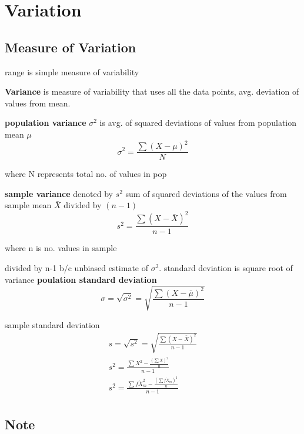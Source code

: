 \documentclass[11pt]{amsart}
\begin{document}
\section{Variation}
\subsection{Measure of Variation}
\par range is simple measure of variability
\par \textbf{Variance} is measure of variability that uses all the data points, avg. deviation of values from mean.
\par \textbf{population variance} $\sigma^2$ is avg. of squared deviations of values from population mean $\mu$
\begin{equation}
\sigma^2 = \frac{\sum{(X-\mu)^2}}{N}
\end{equation}
\par where N represents total no. of values in pop
\par \textbf{sample variance} denoted by $s^2$ sum of squared deviations of the values from sample mean $\bar{X}$ divided by $(n-1)$
\begin{equation}
s^2 = \frac {\sum{(X-\bar{X})^2}}{n-1}
\end{equation}
\par where n is no. values in sample
\par divided by n-1  b/c unbiased estimate of $\sigma^2$. standard deviation is square root of variance
\textbf{poulation standard deviation}
\begin{equation}
\sigma  = \sqrt{\sigma^2} = \sqrt {\frac{\sum{(X-\bar{\mu})^2}}{n-1}}
\end{equation}
\par sample standard deviation
\begin{equation}
\begin{split}
s  = \sqrt{s^2} = \sqrt {\frac{\sum{(X-\bar{X})^2}}{n-1}} \\
s^2 = \frac{\sum{X^2 - \frac{(\sum X)^2}{n}}}{n-1} \\
s^2 = \frac{\sum{f \dot X_m^2 - \frac{(\sum f \dot X_m)^2}{n}}}{n-1} \\
\end{split}
\end{equation}
\subsection{Note}
\end{document}
